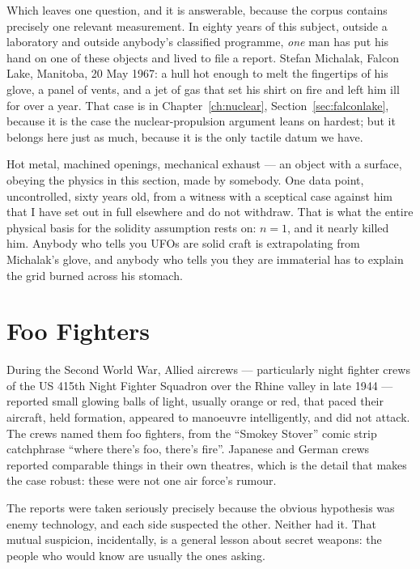 Which leaves one question, and it is answerable, because the corpus contains precisely one
relevant measurement. In eighty years of this subject, outside a laboratory and outside anybody's
classified programme, \emph{one} man has put his hand on one of these objects and lived to file a
report. Stefan Michalak, Falcon Lake, Manitoba, 20 May 1967: a hull hot enough to melt the
fingertips of his glove, a panel of vents, and a jet of gas that set his shirt on fire and left
him ill for over a year. That case is in Chapter~\ref{ch:nuclear}, Section~\ref{sec:falconlake},
because it is the case the nuclear-propulsion argument leans on hardest; but it belongs here just
as much, because it is the only tactile datum we have.

 Hot metal, machined openings, mechanical exhaust --- an object with a
surface, obeying the physics in this section, made by somebody. One data point, uncontrolled,
sixty years old, from a witness with a sceptical case against him that I have set out in full
elsewhere and do not withdraw. That is what the entire physical basis for the solidity assumption
rests on: $n = 1$, and it nearly killed him. Anybody who tells you UFOs are solid craft is
extrapolating from Michalak's glove, and anybody who tells you they are immaterial has to explain
the grid burned across his stomach. 

\section{Foo Fighters}\label{sec:foofighters}

During the Second World War, Allied aircrews --- particularly night fighter crews of the US 415th
Night Fighter Squadron over the Rhine valley in late 1944 --- reported small glowing balls of
light, usually orange or red, that paced their aircraft, held formation, appeared to manoeuvre
intelligently, and did not attack. The crews named them foo fighters, from the ``Smokey Stover''
comic strip catchphrase ``where there's foo, there's fire''. Japanese and German crews reported
comparable things in their own theatres, which is the detail that makes the case robust: these
were not one air force's rumour.

The reports were taken seriously precisely because the obvious hypothesis was enemy technology,
and each side suspected the other. Neither had it. That mutual suspicion, incidentally, is a
general lesson about secret weapons: the people who would know are usually the ones asking.

